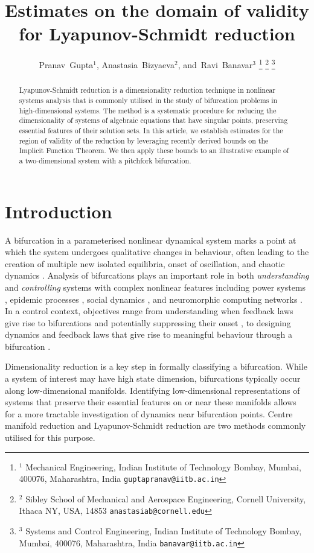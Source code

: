 \documentclass[letterpaper, 10 pt, conference, dvipsnames]{ieeeconf}
\title{\LARGE \bf Estimates on the domain of validity for Lyapunov-Schmidt reduction}
\author{Pranav~Gupta\(^{1}\),
        Anastasia~Bizyaeva\(^{2}\),
        and~Ravi~Banavar\(^{3}\)
    \thanks{\(^1\) Mechanical Engineering, Indian Institute of Technology Bombay, Mumbai, 400076, Maharashtra, India {\tt\small guptapranav@iitb.ac.in}}
    \thanks{\(^{2}\) Sibley School of Mechanical and Aerospace Engineering, Cornell University, Ithaca NY, USA, 14853 {\tt\small anastasiab@cornell.edu}}
    \thanks{\(^{3}\) Systems and Control Engineering, Indian Institute of Technology Bombay, Mumbai, 400076, Maharashtra, India {\tt\small banavar@iitb.ac.in}}
}
\begin{document}
\maketitle
\thispagestyle{empty}
\pagestyle{empty}


\begin{abstract}
    Lyapunov-Schmidt reduction is a dimensionality reduction technique in nonlinear systems analysis that is commonly utilised in the study of bifurcation problems in high-dimensional systems. The method is a systematic procedure for reducing the dimensionality of systems of algebraic equations that have singular points, preserving essential features of their solution sets. In this article, we establish estimates for the region of validity of the reduction by leveraging recently derived bounds on the {Implicit Function Theorem}. We then apply these bounds to an illustrative example of a two-dimensional system with a pitchfork bifurcation.
\end{abstract}




\section{Introduction}

A bifurcation in a parameterised nonlinear dynamical system marks a point at which the system undergoes qualitative changes in behaviour, often leading to the creation of multiple new isolated equilibria, onset of oscillation, and chaotic dynamics \cite{guckenheimer2013nonlinear}. Analysis of bifurcations plays an important role in both \textit{understanding} and \textit{controlling} systems with complex nonlinear features including power systems \cite{ajjarapu1992bifurcation}, epidemic processes \cite{pare2020modeling}, social dynamics \cite{bizyaeva2022nonlinear,bizyaeva2023thesis}, and neuromorphic computing networks \cite{juarez2024analysis}. In a control context, objectives range from understanding when feedback laws give rise to bifurcations and potentially suppressing their onset  \cite{chen1994overview,chen2000bifurcation}, to designing dynamics and feedback laws that give rise to meaningful behaviour through a bifurcation \cite{leonard2024fast}.

Dimensionality reduction is a key step in formally classifying a bifurcation. While a system of interest may have high state dimension, bifurcations typically occur along low-dimensional manifolds. Identifying low-dimensional representations of systems that preserve their essential features on or near these manifolds allows for a more tractable investigation of dynamics near bifurcation points. Centre manifold reduction and Lyapunov-Schmidt reduction are two methods commonly utilised for this purpose.
\end{document}
